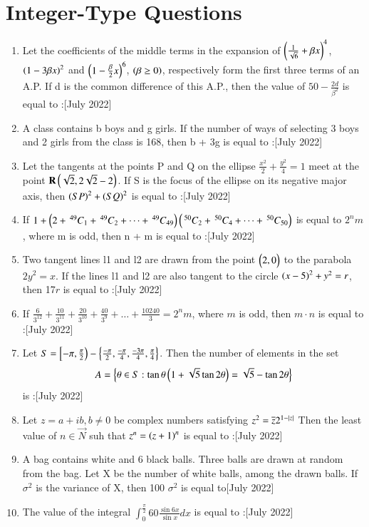 \documentclass[journal,12pt,onecolumn]{IEEEtran}
\newcommand{\nCr}[2]{\,^{#1}C_{#2}}
\theoremstyle{remark}
\begin{document}
\section{Integer-Type Questions}
\begin{enumerate}
	\item Let the coefficients of the middle terms in the expansion of $\left(\frac{1}{\sqrt{6}} + \beta x \right)^4$, $\left(1 - 3 \beta x\right)^2$ and $\left(1 - \frac{\beta}{2} x\right)^6$, $\left(\beta \geq 0\right)$, respectively form the first three terms of an A.P. If d is the common difference of this A.P., then the value of $50 - \frac{2d}{\beta^{2}}$ is equal to :\hfill{[July 2022]}
	\item A class contains b boys and g girls. If the number of ways of selecting 3 boys and 2 girls from the class is 168, then b + 3g is equal to :\hfill{[July 2022]}
	\item Let the tangents at the points P and Q on the ellipse $\frac{x^2}{2} + \frac{y^2}{4} = 1$ meet at the point $\mathbf{R}\begin{pmatrix}\sqrt{2}, 2\sqrt{2}-2\end{pmatrix}$. If S is the focus of the ellipse on its negative major axis, then $\left(SP\right)^2 + \left(SQ\right)^2$ is equal to :\hfill{[July 2022]}
	\item  If $ 1 + \brak{2 + \nCr{49}{1} + \nCr{49}{2} + \dots + \nCr{49}{49}}\brak{\nCr{50}{2} + \nCr{50}{4} + \dots + \nCr{50}{50}}$ is equal to $2^{n}m$, where m is odd, then n + m is equal to :\hfill{[July 2022]}
	\item Two tangent lines l1 and l2 are drawn from the point $\begin{pmatrix}2,0\end{pmatrix}$ to the parabola $2y^2 = x$. If the lines l1 and l2 are also tangent to the circle $\left(x-5\right)^2 + y^2 = r$, then 17$r$ is equal to :\hfill{[July 2022]}
	\item If $\frac{6}{3^{12}} + \frac{10}{3^{11}} + \frac{20}{3^{10}} + \frac{40}{3^{9}} + \dots + \frac{10240}{3} = 2^{n}{m}$, where $m$ is odd, then $m\cdot n$ is equal to :\hfill{[July 2022]}
	\item Let $S = \left[{-\pi, \frac{\pi}{2}}\right) - \left\{\frac{-\pi}{2}, \frac{-\pi}{4}, \frac{-3\pi}{4}, \frac{\pi}{4}\right\}$. Then the number of elements in the set $$ A = \left\{\theta \in S : \tan{\theta}\left(1 + \sqrt{5}\tan{2\theta}\right) = \sqrt{5} - \tan{2\theta}\right\}$$ is :\hfill{[July 2022]}
	\item Let $ z = a + ib, b \neq 0$ be complex numbers satisfying $z^2 = \overline{z} 2^{1 - \left\vert z\right\vert}$ Then the least value of $n \in \vec{N}$ suh that $z^{n} = \left(z+1\right)^{n}$ is equal to :\hfill{[July 2022]}
	\item A bag contains  white and 6 black balls. Three balls are drawn at random from the bag. Let X be the number of white balls, among the drawn balls. If $\sigma^2$ is the variance of X, then 100 $\sigma^2$ is equal to\hfill{[July 2022]}
	\item The value of the integral $\int_{0}^{\frac{\pi}{2}} 60 \frac{\sin{6x}}{\sin{x}} dx $ is equal to :\hfill{[July 2022]}

\end{enumerate}
\end{document}
